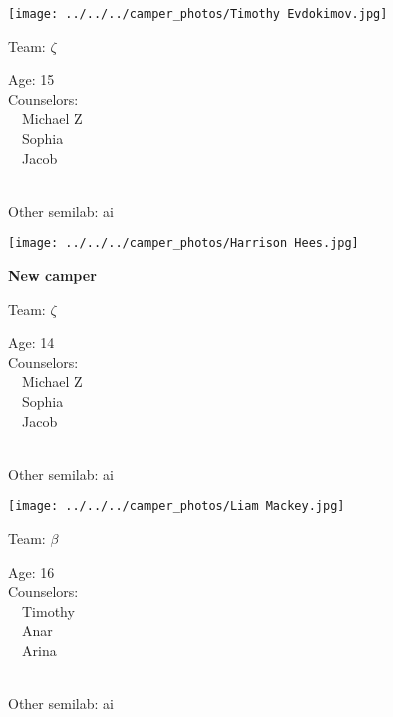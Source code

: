 \documentclass[10pt,letterpaper, landscape]{article}
\begin{document}
\horizontalshiftfornextsticker
\renewcommand{\baselinestretch}{1} \begin{sticker}
\noindent\begin{minipage}{0.5\textwidth}\texttt{[image: ../../../camper\_photos/Timothy Evdokimov.jpg]}\end{minipage}\begin{minipage}{0.45\textwidth}
Team: {\Large $\zeta$}

Age:        15\\
Counselors: \\\ \ Michael Z\\\ \ Sophia\\\ \ Jacob\\
\end{minipage} \\ \vspace{0.07in}
Other semilab: ai
\end{sticker}
\horizontalshiftfornextsticker
\renewcommand{\baselinestretch}{1} \begin{sticker}
\noindent\begin{minipage}{0.5\textwidth}\texttt{[image: ../../../camper\_photos/Harrison Hees.jpg]}\end{minipage}\begin{minipage}{0.45\textwidth}
\textbf{New camper} 

Team: {\Large $\zeta$}

Age:        14\\
Counselors: \\\ \ Michael Z\\\ \ Sophia\\\ \ Jacob\\
\end{minipage} \\ \vspace{0.07in}
Other semilab: ai
\end{sticker}
\verticalshiftfornextsticker
\renewcommand{\baselinestretch}{1} \begin{sticker}
\noindent\begin{minipage}{0.5\textwidth}\texttt{[image: ../../../camper\_photos/Liam Mackey.jpg]}\end{minipage}\begin{minipage}{0.45\textwidth}
Team: {\Large $\beta$}

Age:        16\\
Counselors: \\\ \ Timothy\\\ \ Anar\\\ \ Arina\\
\end{minipage} \\ \vspace{0.07in}
Other semilab: ai
\end{sticker}
\end{document}
